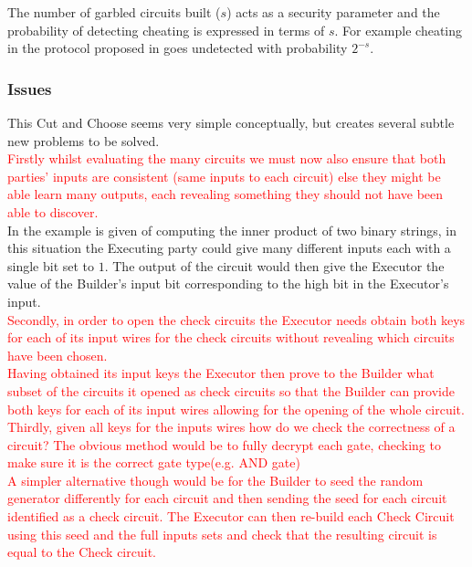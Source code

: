 \documentclass[ %
                    author={Nicholas Tutte},
                supervisor={Prof. Nigel Smart},
                    degree={MEng},
                     title={Secure Two Party Computation},
                  subtitle={A practical comparison of recent protocols},
                      type={Research - GG1K},
                      year={2015} ]{dissertation}
\begin{document}
				The number of garbled circuits built ($s$) acts as a security parameter and the probability of detecting cheating is expressed in terms of $s$. For example cheating in the protocol proposed in \cite{Lindell_CnC_2013} goes undetected with probability $2^{-s}$.\\

			\subsubsection{Issues}
				This Cut and Choose seems very simple conceptually, but creates several subtle new problems to be solved.\\

				\textcolor{red}{Firstly whilst evaluating the many circuits we must now also ensure that both parties' inputs are consistent (same inputs to each circuit) else they might be able learn many outputs, each revealing something they should not have been able to discover.}\\

				In \cite{LindellAndPinkas2007} the example is given of computing the inner product of two binary strings, in this situation the Executing party could give many different inputs each with a single bit set to $1$. The output of the circuit would then give the Executor the value of the Builder's input bit corresponding to the high bit in the Executor's input.\\

				\textcolor{red}{Secondly, in order to open the check circuits the Executor needs obtain both keys for each of its input wires for the check circuits without revealing which circuits have been chosen.}\\

				\textcolor{red}{Having obtained its input keys the Executor then prove to the Builder what subset of the circuits it opened as check circuits so that the Builder can provide both keys for each of its input wires allowing for the opening of the whole circuit.}\\

				\textcolor{red}{Thirdly, given all keys for the inputs wires how do we check the correctness of a circuit? The obvious method would be to fully decrypt each gate, checking to make sure it is the correct gate type(e.g. AND gate)}\\

				\textcolor{red}{A simpler alternative though would be for the Builder to seed the random generator differently for each circuit and then sending the seed for each circuit identified as a check circuit. The Executor can then re-build each Check Circuit using this seed and the full inputs sets and check that the resulting circuit is equal to the Check circuit.}\\
\end{document}
